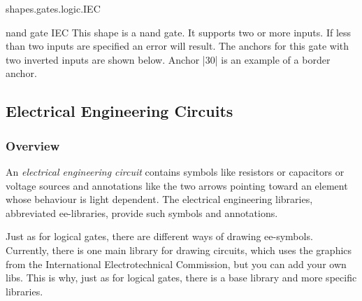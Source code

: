 \begin{pgflibrary}{shapes.gates.logic.IEC}
    \begin{shape}{nand gate IEC}
        This shape is a nand gate. It supports two or more inputs. If less than
        two inputs are specified an error will result. The anchors for this
        gate with two inverted inputs are shown below. Anchor |30| is an
        example of a border anchor.
\begin{codeexample}[]
\Huge
{}
\end{codeexample}
    \end{shape}
\end{pgflibrary}


\subsection{Electrical Engineering Circuits}

\subsubsection{Overview}

An \emph{electrical engineering circuit} contains symbols like resistors or
capacitors or voltage sources and annotations like the two arrows pointing
toward an element whose behaviour is light dependent. The electrical
engineering libraries, abbreviated ee-libraries, provide such symbols and
annotations.

Just as for logical gates, there are different ways of drawing ee-symbols.
Currently, there is one main library for drawing circuits, which uses the
graphics from the International Electrotechnical Commission, but you can add
your own libs. This is why, just as for logical gates, there is a base library
and more specific libraries.

